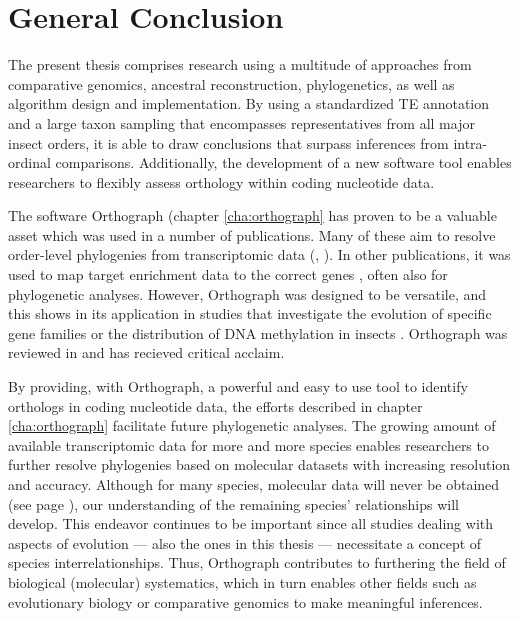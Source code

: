 \chapter{General Conclusion}
\label{conclusion}

The present thesis comprises research using a multitude of approaches
from comparative genomics, ancestral reconstruction, phylogenetics,
as well as algorithm design and implementation. By using a standardized TE
annotation and a large taxon sampling that encompasses representatives
from all major insect orders, it is able to draw conclusions that
surpass inferences from intra-ordinal comparisons.  Additionally, the
development of a new software tool enables researchers to flexibly
assess orthology within coding nucleotide data.

The software Orthograph (chapter \ref{cha:orthograph} has proven to be a
valuable asset which was used in a number of publications. Many of these
aim to resolve order-level phylogenies from transcriptomic data (\eg,
\citet{Bank2017, Peters2017, Kutty2018, Gillung2018, Johnson2018,
Simon2018}). In other publications, it was used to map target enrichment
data to the correct genes \citep{Mayer2016, Sann2018, Shin2018}, often
also for phylogenetic analyses. However, Orthograph was designed to be
versatile, and this shows in its application in studies that investigate
the evolution of specific gene families \citep{Pauli2016, Dowling2017}
or the distribution of DNA methylation in insects
\citep{Provataris2018}.  Orthograph was reviewed in \citet{Nichio2017}
and has recieved critical acclaim.

By providing, with Orthograph, a powerful and easy to use tool to
identify orthologs in coding nucleotide data, the efforts described in
chapter \ref{cha:orthograph} facilitate future phylogenetic analyses.
The growing amount of available transcriptomic data for more and more
species enables researchers to further resolve phylogenies based on
molecular datasets with increasing resolution and accuracy. Although for
many species, molecular data will never be obtained (see page
\pageref{mass-extinction}), our understanding of the remaining species'
relationships will develop. This endeavor continues to be important
since all studies dealing with aspects of evolution --- also the ones in
this thesis --- necessitate a concept of species interrelationships.
Thus, Orthograph contributes to furthering the field of biological
(molecular) systematics, which in turn enables other fields such as
evolutionary biology or comparative genomics to make meaningful
inferences.

